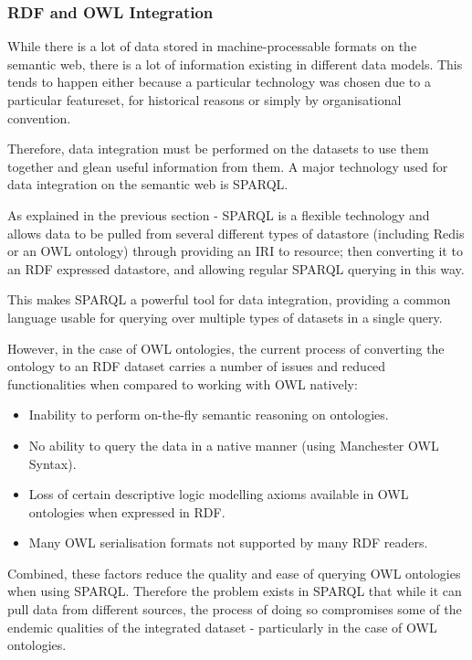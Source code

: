 \documentclass{article}
\begin{document}
\subsubsection{RDF and OWL Integration}

While there is a lot of data stored in machine-processable formats on the semantic web, 
there is a lot of information existing in different data models. This 
tends to happen either because a particular technology was chosen due to 
a particular featureset, for historical reasons or simply by organisational convention.

Therefore, data integration must be performed on the datasets to use them
together and glean useful information from them. A major technology used for 
data integration on the semantic web is SPARQL.

As explained in the previous section - SPARQL is a flexible technology and allows 
data to be pulled from several different types of datastore (including Redis or an 
OWL ontology) through providing an IRI to resource; then converting it to an RDF 
expressed datastore, and allowing regular SPARQL querying in this way. 

This makes SPARQL a powerful tool for data integration, providing a common
language usable for querying over multiple types of datasets in a single query.

However, in the case of OWL ontologies, the current process of converting the
ontology to an RDF dataset carries a number of issues and reduced
functionalities when compared to working with OWL natively:

\begin{itemize}
  \item Inability to perform on-the-fly semantic reasoning on ontologies.
  \item No ability to query the data in a native manner (using Manchester OWL Syntax).
  \item Loss of certain descriptive logic modelling axioms available in OWL
  ontologies when expressed in RDF.
  \item Many OWL serialisation formats not supported by many RDF readers.
\end{itemize}

Combined, these factors reduce the quality and ease of querying OWL ontologies when 
using SPARQL. Therefore the problem exists in SPARQL that while it can pull data
from different sources, the process of doing so compromises some of the endemic
qualities of the integrated dataset - particularly in the case of OWL
ontologies.
\end{document}
